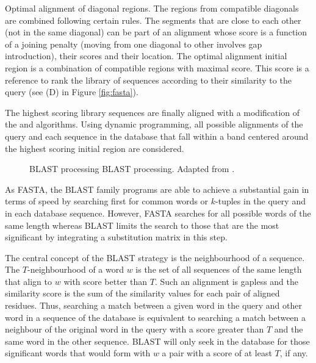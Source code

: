 \begin{menumerate}
\item
Optimal alignment of diagonal regions. The regions from compatible diagonals are combined following 
certain rules. The segments that are close to each other (not in the same diagonal) can be part of an 
alignment whose score is a function of a joining penalty (moving from one diagonal to other involves gap
introduction), their scores and their location. The optimal alignment initial region is a combination of 
compatible regions with maximal score. This score is a reference to rank the library of sequences according 
to their similarity to the query (see (D) in Figure \ref{fig:fasta}). 

\item
The highest scoring library sequences are finally aligned with a modification of the 
\citeauthor{needleman:1970a} and \citeauthor{smith:1981c} algorithms. Using dynamic programming, all 
possible alignments of the query and each sequence in the database that fall within a band centered 
around the highest scoring initial region are considered.
\end{menumerate}


\begin{figure}[t!]
\begin{center}
\setlength{\fboxsep}{0pt}
          {BLAST processing}%
          {BLAST processing.}%
          {Adapted from \citet{pertsemlidis:2001a}.}
\end{center}
\end{figure}


  
As FASTA, the BLAST family programs \citep{altschul:1990a,altschul:1997a} are able to achieve a 
substantial gain in terms of speed by searching first for common words or $k$-tuples in the query and 
in each database sequence. However, FASTA searches for all possible words of the same length whereas BLAST
limits the search to those that are the most significant by integrating a substitution matrix in this step.

The central concept of the BLAST strategy is the neighbourhood of a sequence. The $T$-neighbourhood of
a word $w$ is the set of all sequences of the same length that align to $w$ with score better than $T$. 
Such an alignment is gapless and the similarity score is the sum of the similarity values for each pair
of aligned residues. Thus, searching a match between a given word in the query and other word 
in a sequence of the database is equivalent to searching a match between a neighbour of the original word 
in the query with a score greater than $T$ and the same word in the other sequence. BLAST will only seek 
in the database for those significant words that would form with $w$ a pair with a score of at least $T$, 
if any.

